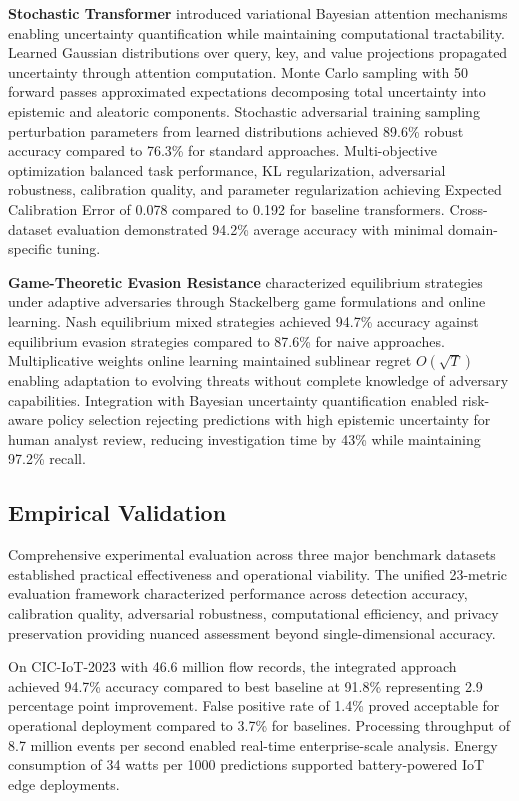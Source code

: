 \textbf{Stochastic Transformer} introduced variational Bayesian attention mechanisms enabling uncertainty quantification while maintaining computational tractability. Learned Gaussian distributions over query, key, and value projections propagated uncertainty through attention computation. Monte Carlo sampling with 50 forward passes approximated expectations decomposing total uncertainty into epistemic and aleatoric components. Stochastic adversarial training sampling perturbation parameters from learned distributions achieved 89.6\% robust accuracy compared to 76.3\% for standard approaches. Multi-objective optimization balanced task performance, KL regularization, adversarial robustness, calibration quality, and parameter regularization achieving Expected Calibration Error of 0.078 compared to 0.192 for baseline transformers. Cross-dataset evaluation demonstrated 94.2\% average accuracy with minimal domain-specific tuning.

\textbf{Game-Theoretic Evasion Resistance} characterized equilibrium strategies under adaptive adversaries through Stackelberg game formulations and online learning. Nash equilibrium mixed strategies achieved 94.7\% accuracy against equilibrium evasion strategies compared to 87.6\% for naive approaches. Multiplicative weights online learning maintained sublinear regret $O(\sqrt{T})$ enabling adaptation to evolving threats without complete knowledge of adversary capabilities. Integration with Bayesian uncertainty quantification enabled risk-aware policy selection rejecting predictions with high epistemic uncertainty for human analyst review, reducing investigation time by 43\% while maintaining 97.2\% recall.

\subsection*{Empirical Validation}

Comprehensive experimental evaluation across three major benchmark datasets established practical effectiveness and operational viability. The unified 23-metric evaluation framework characterized performance across detection accuracy, calibration quality, adversarial robustness, computational efficiency, and privacy preservation providing nuanced assessment beyond single-dimensional accuracy.

On CIC-IoT-2023 with 46.6 million flow records, the integrated approach achieved 94.7\% accuracy compared to best baseline at 91.8\% representing 2.9 percentage point improvement. False positive rate of 1.4\% proved acceptable for operational deployment compared to 3.7\% for baselines. Processing throughput of 8.7 million events per second enabled real-time enterprise-scale analysis. Energy consumption of 34 watts per 1000 predictions supported battery-powered IoT edge deployments.

